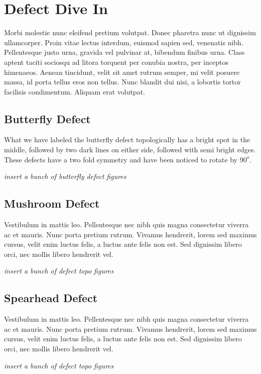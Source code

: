 \section{Defect Dive In}


Morbi molestie nunc eleifend pretium volutpat. Donec pharetra nunc ut dignissim ullamcorper. Proin vitae lectus interdum, euismod sapien sed, venenatis nibh. Pellentesque justo urna, gravida vel pulvinar at, bibendum finibus urna. Class aptent taciti sociosqu ad litora torquent per conubia nostra, per inceptos himenaeos. Aenean tincidunt, velit sit amet rutrum semper, mi velit posuere massa, id porta tellus eros non tellus. Nunc blandit dui nisi, a lobortis tortor facilisis condimentum. Aliquam erat volutpat.

\subsection{Butterfly Defect}

What we have labeled the butterfly defect topologically has a bright spot in the middle, followed by two dark lines on either side, followed with semi bright edges. These defects have a two fold symmetry and have been noticed to rotate by $90^o$.

\emph{insert a bunch of butterfly defect figures}

\subsection{Mushroom Defect}
Vestibulum in mattis leo. Pellentesque nec nibh quis magna consectetur viverra ac et mauris. Nunc porta pretium rutrum. Vivamus hendrerit, lorem sed maximus cursus, velit enim luctus felis, a luctus ante felis non est. Sed dignissim libero orci, nec mollis libero hendrerit vel. 

\emph{insert a bunch of defect topo figures}

\subsection{Spearhead Defect}
Vestibulum in mattis leo. Pellentesque nec nibh quis magna consectetur viverra ac et mauris. Nunc porta pretium rutrum. Vivamus hendrerit, lorem sed maximus cursus, velit enim luctus felis, a luctus ante felis non est. Sed dignissim libero orci, nec mollis libero hendrerit vel. 

\emph{insert a bunch of defect topo figures}

